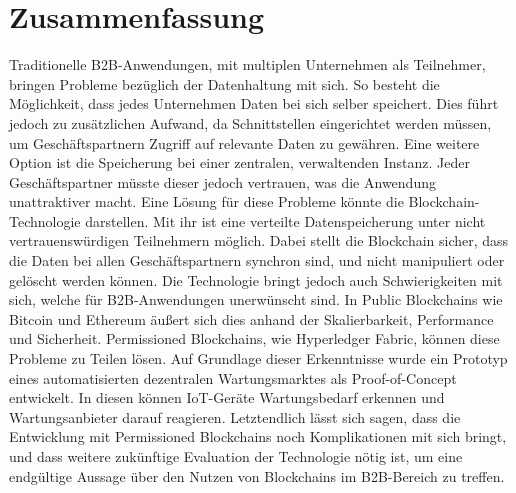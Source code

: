 \pagestyle{empty} %

\chapter*{Zusammenfassung} %
\label{cha:abtract}
Traditionelle B2B-Anwendungen, mit multiplen Unternehmen als Teilnehmer, bringen Probleme bezüglich der Datenhaltung mit sich. So besteht die Möglichkeit, dass jedes Unternehmen Daten bei sich selber speichert. Dies führt jedoch zu zusätzlichen Aufwand, da Schnittstellen eingerichtet werden müssen, um Geschäftspartnern Zugriff auf relevante Daten zu gewähren. Eine weitere Option ist die Speicherung bei einer zentralen, verwaltenden Instanz. Jeder Geschäftspartner müsste dieser jedoch vertrauen, was die Anwendung unattraktiver macht. Eine Lösung für diese Probleme könnte die Blockchain-Technologie darstellen. Mit ihr ist eine verteilte Datenspeicherung unter nicht vertrauenswürdigen Teilnehmern möglich. Dabei stellt die Blockchain sicher, dass die Daten bei allen Geschäftspartnern synchron sind, und nicht manipuliert oder gelöscht werden können. Die Technologie bringt jedoch auch Schwierigkeiten mit sich, welche für B2B-Anwendungen unerwünscht sind. In Public Blockchains wie Bitcoin und Ethereum äußert sich dies anhand der Skalierbarkeit, Performance und Sicherheit. Permissioned Blockchains, wie Hyperledger Fabric, können diese Probleme zu Teilen lösen. Auf Grundlage dieser Erkenntnisse wurde ein Prototyp eines automatisierten dezentralen Wartungsmarktes als Proof-of-Concept entwickelt. In diesen können IoT-Geräte Wartungsbedarf erkennen und Wartungsanbieter darauf reagieren. Letztendlich lässt sich sagen, dass die Entwicklung mit Permissioned Blockchains noch Komplikationen mit sich bringt, und dass weitere zukünftige Evaluation der Technologie nötig ist, um eine endgültige Aussage über den Nutzen von Blockchains im B2B-Bereich zu treffen.

